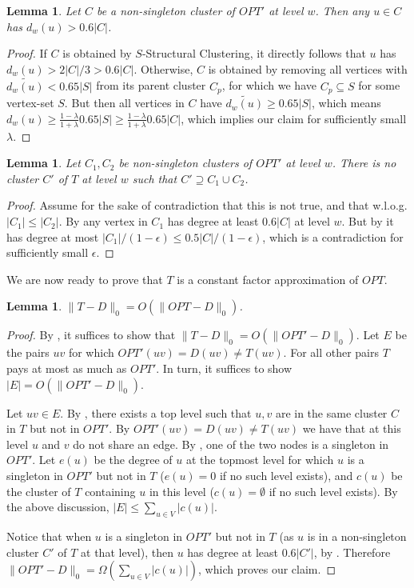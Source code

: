 \documentclass{article}
\newtheorem{lemma}[theorem]{Lemma}
\begin{document}
\begin{lemma} \label{lem:Tdense}
Let $C$ be a non-singleton cluster of $OPT'$ at level $w$.
Then any $u\in C$ has $d_w(u) > 0.6|C|$.
\end{lemma}
\begin{proof}
If $C$ is obtained by $S$-Structural Clustering, it directly follows that $u$ has $d_w(u) > 2|C|/3 > 0.6|C|$.
Otherwise, $C$ is obtained by removing all vertices with $\widetilde{d_w(u)} < 0.65|S|$ from its parent cluster $C_p$, for which we have $C_p \subseteq S$ for some vertex-set $S$.
But then all vertices in $C$ have $\widetilde{d_w(u)} \ge 0.65|S|$, which means $d_w(u) \ge \frac{1-\lambda}{1+\lambda} 0.65 |S| \ge \frac{1-\lambda}{1+\lambda} 0.65 |C|$, which implies our claim for sufficiently small $\lambda$.
\end{proof}

\begin{lemma} \label{lem:no2inside}
Let $C_1, C_2$ be non-singleton clusters of $OPT'$ at level $w$. There is no cluster $C'$ of $T$ at level $w$ such that $C'\supseteq C_1\cup C_2$.
\end{lemma}
\begin{proof}
Assume for the sake of contradiction that this is not true, and that w.l.o.g. $|C_1| \le |C_2|$.
By  any vertex in $C_1$ has degree at least $0.6|C|$ at level $w$.
But by  it has degree at most $|C_1| / (1-\epsilon) \le 0.5|C| / (1-\epsilon)$, which is a contradiction for sufficiently small $\epsilon$.
\end{proof}

We are now ready to prove that $T$ is a constant factor approximation of $OPT$.
\begin{lemma}
$\|T-D\|_0 = O(\|OPT-D\|_0)$.
\end{lemma}
\begin{proof}
By , it suffices to show that $\|T-D\|_0 = O(\|OPT'-D\|_0)$.
Let $E$ be the pairs $uv$ for which $OPT'(uv) = D(uv) \ne T(uv)$.
For all other pairs $T$ pays at most as much as $OPT'$.
In turn, it suffices to show $|E| = O(\|OPT'-D\|_0)$.

Let $uv\in E$.
By , there exists a top level such that $u,v$ are in the same cluster $C$ in $T$ but not in $OPT'$.
By $OPT'(uv)=D(uv)\ne T(uv)$ we have that at this level $u$ and $v$ do not share an edge.
By , one of the two nodes is a singleton in $OPT'$.
Let $e(u)$ be the degree of $u$ at the topmost level for which $u$ is a singleton in $OPT'$ but not in $T$ ($e(u)=0$ if no such level exists), and $c(u)$ be the cluster of $T$ containing $u$ in this level ($c(u)=\emptyset$ if no such level exists).
By the above discussion, $|E| \le \sum_{u\in V} |c(u)|$.

Notice that when $u$ is a singleton in $OPT'$ but not in $T$ (as $u$ is in a non-singleton cluster $C'$ of $T$ at that level), then $u$ has degree at least $0.6|C'|$, by .
Therefore $\|OPT'-D\|_0 = \Omega(\sum_{u\in V} |c(u)|)$, which proves our claim.
\end{proof}
\end{document}
